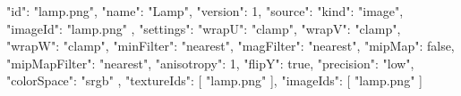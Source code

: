 {
  "id": "lamp.png",
  "name": "Lamp",
  "version": 1,
  "source": {
    "kind": "image",
    "imageId": "lamp.png"
  },
  "settings": {
    "wrapU": "clamp",
    "wrapV": "clamp",
    "wrapW": "clamp",
    "minFilter": "nearest",
    "magFilter": "nearest",
    "mipMap": false,
    "mipMapFilter": "nearest",
    "anisotropy": 1,
    "flipY": true,
    "precision": "low",
    "colorSpace": "srgb"
  },
  "textureIds": [
    "lamp.png"
  ],
  "imageIds": [
    "lamp.png"
  ]
}
